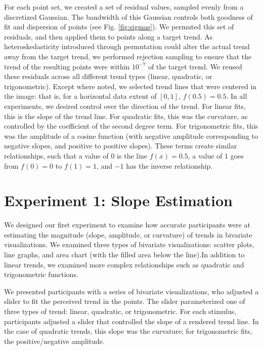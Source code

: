 \documentclass{sigchi}
\begin{document}
For each point set, we created a set of residual values, sampled evenly from a discretized Gaussian. The bandwidth of this Gaussian controls both goodness of fit and dispersion of points (see Fig. \ref{fig:sigmas}). We permuted this set of residuals, and then applied them to points along a target trend. As heteroskedasticity introduced through permutation could alter the actual trend away from the target trend, we performed rejection sampling to ensure that the trend of the resulting points were within $10^{-7}$ of the target trend. We reused these residuals across all different trend types (linear, quadratic, or trigonometric). Except where noted, we selected trend lines that were centered in the image: that is, for a horizontal data extent of $[0,1]$, $f(0.5) = 0.5$. In all experiments, we desired control over the direction of the trend. For linear fits, this is the slope of the trend line. For quadratic fits, this was the curvature, as controlled by the coefficient of the second degree term. For trigonometric fits, this was the amplitude of a cosine function (with negative amplitude corresponding to negative slopes, and positive to positive slopes). These terms create similar relationships, such that a value of $0$ is the line $f(x)=0.5$, a value of $1$ goes from $f(0)=0$ to $f(1)=1$, and $-1$ has the inverse relationship.


\section{Experiment 1: Slope Estimation}

\expOnesigmasFig

We designed our first experiment to examine how accurate participants were at estimating the magnitude (slope, amplitude, or curvature) of trends in bivariate visualizations. We examined three types of bivariate visualizations: scatter plots, line graphs, and area chart (with the filled area below the line).In addition to linear trends, we examined more complex relationships such as quadratic and trigonometric functions.

We presented participants with a series of bivariate visualizations, who adjusted a slider to fit the perceived trend in the points. The slider parameterized one of three types of trend: linear, quadratic, or trigonometric. For each stimulus, participants adjusted a slider that controlled the slope of a rendered trend line. In the case of quadratic trends, this slope was the curvature; for trigonometric fits, the positive/negative amplitude. 
\end{document}
